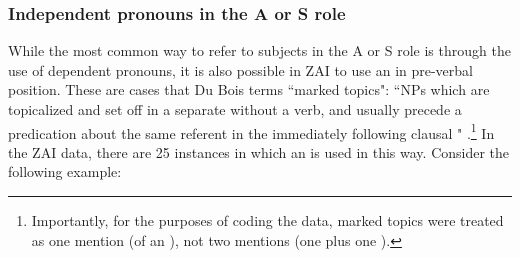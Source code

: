 \subsubsection{Independent pronouns in the A or S role}\label{markedtopics}

While the most common way to refer to subjects in the A or S role is through the use of dependent pronouns, it is also possible in ZAI to use an  in pre-verbal position. These are cases that Du Bois terms ``marked topics": ``NPs which are topicalized and set off in a separate  without a verb, and usually precede a predication about the same referent in the immediately following clausal " \citep[814, note 11]{dubois1987}.\footnote{Importantly, for the purposes of coding the data, marked topics were treated as one mention (of an ), not two mentions (one  plus one ).} In the ZAI data, there are 25 instances in which an  is used in this way. Consider the following example: 

